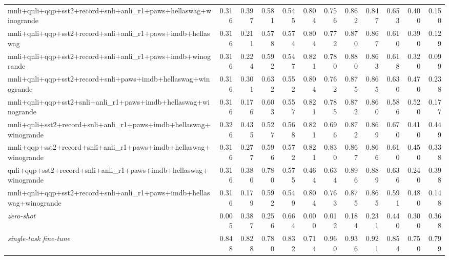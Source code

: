 \begin{table}[t]
\begin{tabular}{lrrrrrrrrrrr}
    mnli+qnli+qqp+sst2+record+snli+anli\_r1+paws+hellaswag+winogrande & 0.316 & 0.397 & 0.581 & 0.545 & 0.804 & 0.756 & 0.862 & 0.847 & 0.653 & 0.400 & 0.150 \\
    mnli+qnli+qqp+sst2+record+snli+anli\_r1+paws+imdb+hellaswag & 0.316 & 0.211 & 0.578 & 0.574 & 0.804 & 0.772 & 0.870 & 0.867 & 0.610 & 0.390 & 0.129 \\
    mnli+qnli+qqp+sst2+record+snli+anli\_r1+paws+imdb+winogrande & 0.316 & 0.224 & 0.592 & 0.547 & 0.821 & 0.780 & 0.880 & 0.863 & 0.618 & 0.320 & 0.099 \\
    mnli+qnli+qqp+sst2+record+snli+paws+imdb+hellaswag+winogrande & 0.316 & 0.301 & 0.632 & 0.552 & 0.804 & 0.762 & 0.875 & 0.865 & 0.630 & 0.470 & 0.238 \\
    mnli+qnli+qqp+sst2+snli+anli\_r1+paws+imdb+hellaswag+winogrande & 0.316 & 0.176 & 0.603 & 0.557 & 0.821 & 0.785 & 0.872 & 0.860 & 0.586 & 0.520 & 0.177 \\
    mnli+qnli+sst2+record+snli+anli\_r1+paws+imdb+hellaswag+winogrande & 0.326 & 0.435 & 0.527 & 0.568 & 0.821 & 0.696 & 0.872 & 0.869 & 0.670 & 0.410 & 0.449 \\
    mnli+qqp+sst2+record+snli+anli\_r1+paws+imdb+hellaswag+winogrande & 0.316 & 0.277 & 0.596 & 0.572 & 0.821 & 0.830 & 0.867 & 0.866 & 0.610 & 0.450 & 0.338 \\
    qnli+qqp+sst2+record+snli+anli\_r1+paws+imdb+hellaswag+winogrande & 0.316 & 0.380 & 0.780 & 0.575 & 0.464 & 0.634 & 0.896 & 0.889 & 0.636 & 0.240 & 0.398 \\
    \addlinespace
    mnli+qnli+qqp+sst2+record+snli+anli\_r1+paws+imdb+hellaswag+winogrande & 0.316 & 0.179 & 0.592 & 0.549 & 0.804 & 0.763 & 0.875 & 0.865 & 0.591 & 0.480 & 0.148 \\
    \midrule
    \textit{zero-shot} & 0.005 & 0.387 & 0.256 & 0.664 & 0.000 & 0.012 & 0.184 & 0.231 & 0.440 & 0.300 & 0.368 \\
    \textit{single-task fine-tune} & 0.848 & 0.828 & 0.780 & 0.832 & 0.714 & 0.960 & 0.936 & 0.921 & 0.854 & 0.750 & 0.799 \\
    \bottomrule
  \end{tabular}
\end{table}
